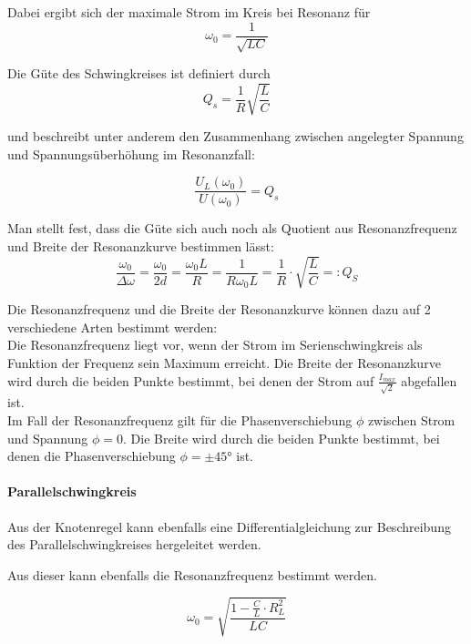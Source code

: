 \documentclass[12pt,a4paper]{article}
\begin{document}
Dabei ergibt sich der maximale Strom im Kreis bei Resonanz für
\begin{equation}
\omega_0 = \frac{1}{\sqrt{LC}}
\end{equation} 

Die Güte des Schwingkreises ist definiert durch
\begin{equation}
Q_s = \frac{1}{R} \sqrt{\frac{L}{C}}
\label{equ:Guete_Bauteile_Groesse}
\end{equation}

und beschreibt unter anderem den Zusammenhang zwischen angelegter Spannung und Spannungsüberhöhung im Resonanzfall:

\begin{equation}
\frac{U_L(\omega_0)}{U(\omega_0)} = Q_s 
\label{equ:Guete_Spannungsüberhöhung}
\end{equation}

Man stellt fest, dass die Güte sich auch noch als Quotient aus Resonanzfrequenz und Breite der Resonanzkurve bestimmen lässt:
\begin{equation}
\dfrac{\omega_0}{\Delta \omega} = \dfrac{\omega_0}{2d} = \dfrac{\omega_0 L}{R} = \dfrac{1}{R \omega_0 L} = \dfrac{1}{R} \cdot \sqrt{\dfrac{L}{C}} =: Q_S
\label{equ:Guete_Resonanzbreite}
\end{equation}

Die Resonanzfrequenz und die Breite der Resonanzkurve können dazu auf 2 verschiedene Arten bestimmt werden:\\
Die Resonanzfrequenz liegt vor, wenn der Strom im Serienschwingkreis als Funktion der Frequenz sein Maximum erreicht. Die Breite der Resonanzkurve wird durch die beiden Punkte bestimmt, bei denen der Strom auf $\frac{I_{max}}{\sqrt{2}}$ abgefallen ist.\\
Im Fall der Resonanzfrequenz gilt für die Phasenverschiebung $\phi$ zwischen Strom und Spannung $\phi = 0$. Die Breite wird durch die beiden Punkte bestimmt, bei denen die Phasenverschiebung $\phi = \pm \ang{45}$ ist.



\paragraph{Parallelschwingkreis}
Aus der Knotenregel kann ebenfalls eine Differentialgleichung zur Beschreibung des Parallelschwingkreises hergeleitet werden.

Aus dieser kann ebenfalls die Resonanzfrequenz bestimmt werden.

\begin{equation}
\omega_0 = \sqrt{\frac{1-\frac{C}{L}\cdot R_L^2}{LC}}
\end{equation} 
\end{document}
